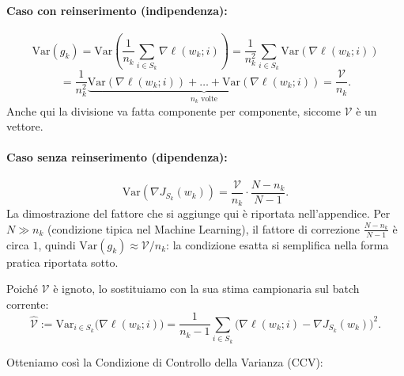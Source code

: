 \documentclass[a4paper,12pt]{article}
\newcommand{\Var}{\mathrm{Var}}
\begin{document}
\paragraph{Caso con reinserimento (indipendenza):}
\[
  \Var(g_k) = \Var\!\left(\frac{1}{n_k}\sum_{i\in S_k}\nabla\ell(w_k;i)\right)
  = \frac{1}{n_k^2}\sum_{i\in S_k}\Var(\nabla\ell(w_k;i))
  \]\[
  = \frac{1}{n_k^2}\underbrace{\Var(\nabla\ell(w_k;i))+\dots+\Var(\nabla\ell(w_k;i))}_{n_k \text{ volte}}
  = \frac{\mathcal{V}}{n_k}.
\]
Anche qui la divisione va fatta componente per componente, siccome $\mathcal{V}$ è un vettore.
\paragraph{Caso senza reinserimento (dipendenza):}
\[
  \Var\!\left(\nabla J_{S_k}(w_k)\right) = \frac{\mathcal{V}}{n_k}\cdot\frac{N-n_k}{N-1}.
\]
La dimostrazione del fattore che si aggiunge qui è riportata nell'appendice.
Per $N \gg n_k$ (condizione tipica nel Machine Learning), il fattore di correzione $\frac{N-n_k}{N-1}$ è circa $1$, quindi $\Var(g_k) \approx \mathcal{V}/n_k$: la condizione esatta si semplifica nella forma pratica riportata sotto.

Poich\'e $\mathcal{V}$ \`e ignoto, lo sostituiamo con la sua stima campionaria sul batch corrente:
\[
  \widehat{\mathcal{V}} := \Var_{i \in S_k}\bigl(\nabla \ell(w_k;i)\bigr)
  = \frac{1}{n_k-1}\sum_{i\in S_k}\bigl(\nabla \ell(w_k;i) - \nabla J_{S_k}(w_k)\bigr)^2.
\]

Otteniamo cos\`i la Condizione di Controllo della Varianza (CCV):
\end{document}
